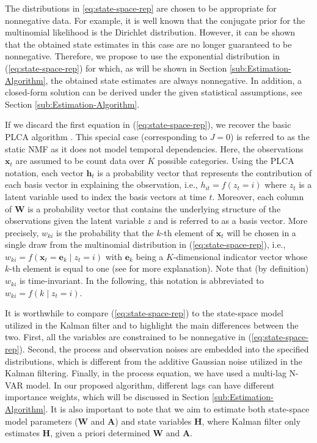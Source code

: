 \documentclass[10pt,twocolumn,twoside] {IEEEtran}
\begin{document}
The distributions in \eqref{eq:state-space-rep} are chosen to be appropriate for nonnegative data. For example, it is well known that the conjugate prior for the multinomial likelihood
is the Dirichlet distribution. However, it can be shown that the obtained
state estimates in this case are no longer guaranteed to be nonnegative.
Therefore, we propose to use the exponential distribution in (\ref{eq:state-space-rep})
for which, as will be shown in Section \ref{sub:Estimation-Algorithm}, the obtained state estimates
are always nonnegative. In addition, a closed-form solution can be derived under the given statistical assumptions, see Section \ref{sub:Estimation-Algorithm}.


If we discard the first equation in (\ref{eq:state-space-rep}), we
recover the basic PLCA algorithm \cite{Smaragdis2006}. This special case (corresponding to $J=0$) is referred to as the static NMF as it does not model temporal dependencies. Here, the observations $\mathbf{x}_{t}$ are assumed
to be count data over $K$ possible categories. Using the PLCA notation,
each vector $\mathbf{h}_{t}$ is a probability vector that represents
the contribution of each basis vector in explaining the observation,
i.e., $h_{it}=f\left(z_{t}=i\right)$ where $z_{t}$ is a latent variable
used to index the basis vectors at time $t$. Moreover, each column
of $\mathbf{W}$ is a probability vector that contains the underlying
structure of the observations given the latent variable $z$ and is referred to as a basis vector. More
precisely, $w_{ki}$ is the probability that the $k$-th element of
$\mathbf{x}_t$ will be chosen in a single draw from the multinomial
distribution in (\ref{eq:state-space-rep}), i.e., $w_{ki}=f\left(\mathbf{x}_t=\mathbf{e}_{k}\mid z_t=i\right)$
with $\mathbf{e}_{k}$ being a $K$-dimensional indicator vector whose $k$-th
element is equal to one (see \cite{Mohammadiha2013b} for more explanation). Note that (by definition) $w_{ki}$ is time-invariant. In the following, this notation is
abbreviated to $w_{ki}=f\left(k\mid z_t=i\right)$.

It is worthwhile to compare (\ref{eq:state-space-rep}) to the state-space
model utilized in the Kalman filter and to highlight the main differences between the two. First, all the variables
are constrained to be nonnegative in (\ref{eq:state-space-rep}).
Second, the process and observation noises are embedded into the
specified distributions, which is different from the additive Gaussian
noise utilized in the Kalman filtering. Finally, in the process equation,
we have used a multi-lag N-VAR model. In our proposed algorithm, different lags can have different importance weights, which will be discussed in Section \ref{sub:Estimation-Algorithm}.
It is also important to note that we aim to estimate both state-space model parameters ($\mathbf{W}$ and $\mathbf{A}$) and state variables $\mathbf{H}$, where Kalman filter only estimates $\mathbf{H}$, given a priori determined $\mathbf{W}$ and $\mathbf{A}$.
\end{document}
